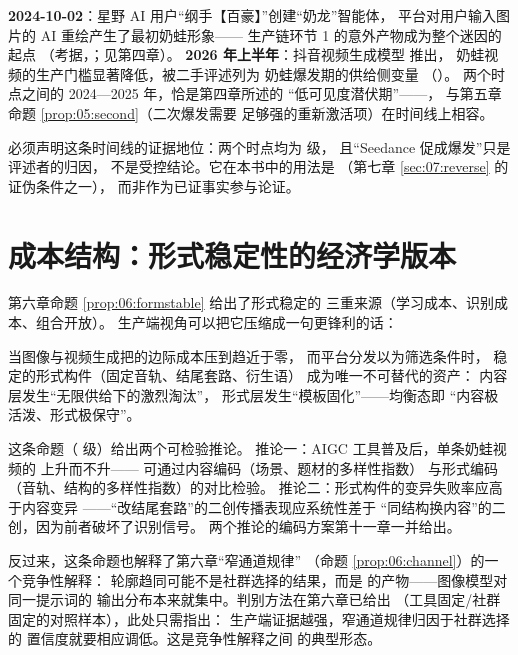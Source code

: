 \begin{nlhistory}
  \textbf{2024-10-02}：星野 AI 用户“纲手【百豪】”创建“奶龙”智能体，
  平台对用户输入图片的 AI 重绘产生了最初奶蛙形象——
  生产链环节 1 的意外产物成为整个迷因的起点
  （考据，\cite{lostmedia2026naiwa}；见第四章）。
  \textbf{2026 年上半年}：抖音视频生成模型  推出，
  奶蛙视频的生产门槛显著降低，被二手评述列为
  奶蛙爆发期的供给侧变量
  （\cite{shoutanji2026naiwa}）。
  两个时点之间的 2024—2025 年，恰是第四章所述的
  “低可见度潜伏期”——，
  与第五章命题 \ref{prop:05:second}（二次爆发需要
  足够强的重新激活项）在时间线上相容。
\end{nlhistory}

必须声明这条时间线的证据地位：两个时点均为  级，
且“Seedance 促成爆发”只是评述者的归因，
不是受控结论。它在本书中的用法是
（第七章 \ref{sec:07:reverse} 的证伪条件之一），
而非作为已证事实参与论证。

\section{成本结构：形式稳定性的经济学版本}\label{sec:08:cost}

第六章命题 \ref{prop:06:formstable} 给出了形式稳定的
三重来源（学习成本、识别成本、组合开放）。
生产端视角可以把它压缩成一句更锋利的话：

\begin{proposition}\label{prop:08:asym}
  当图像与视频生成把的边际成本压到趋近于零，
  而平台分发以为筛选条件时，
  稳定的形式构件（固定音轨、结尾套路、衍生语）
  成为唯一不可替代的资产：
  内容层发生“无限供给下的激烈淘汰”，
  形式层发生“模板固化”——均衡态即
  “内容极活泼、形式极保守”。
\end{proposition}

这条命题（ 级）给出两个可检验推论。
推论一：AIGC 工具普及后，单条奶蛙视频的
上升而不升——
可通过内容编码（场景、题材的多样性指数）
与形式编码（音轨、结构的多样性指数）的对比检验。
推论二：形式构件的变异失败率应高于内容变异
——“改结尾套路”的二创传播表现应系统性差于
“同结构换内容”的二创，因为前者破坏了识别信号。
两个推论的编码方案第十一章一并给出。

反过来，这条命题也解释了第六章“窄通道规律”
（命题 \ref{prop:06:channel}）的一个竞争性解释：
轮廓趋同可能不是社群选择的结果，而是
的产物——图像模型对同一提示词的
输出分布本来就集中。判别方法在第六章已给出
（工具固定/社群固定的对照样本），此处只需指出：
生产端证据越强，窄通道规律归因于社群选择的
置信度就要相应调低。这是竞争性解释之间
的典型形态。

